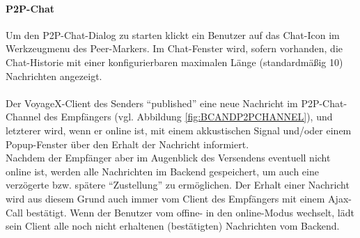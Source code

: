 \paragraph{P2P-Chat}
Um den P2P-Chat-Dialog zu starten klickt ein Benutzer auf das Chat-Icon im Werkzeugmenu des Peer-Markers. 
Im Chat-Fenster wird, sofern vorhanden, die Chat-Historie mit einer konfigurierbaren maximalen Länge (standardmäßig 10) Nachrichten angezeigt.\\ \\
Der VoyageX-Client des Senders "`published"' eine neue Nachricht im P2P-Chat-Channel des Empfängers (vgl. Abbildung \ref{fig:BCANDP2PCHANNEL}), und letzterer wird, wenn er online ist, mit einem akkustischen Signal und/oder einem Popup-Fenster über den Erhalt der Nachricht informiert.\\
Nachdem der Empfänger aber im Augenblick des Versendens eventuell nicht online ist, werden alle Nachrichten im Backend gespeichert, um auch eine verzögerte bzw. spätere "`Zustellung"' zu ermöglichen. Der Erhalt einer Nachricht wird aus diesem Grund auch immer vom Client des Empfängers mit einem Ajax-Call bestätigt. Wenn der Benutzer vom offine- in den online-Modus wechselt, lädt sein Client alle noch nicht erhaltenen (bestätigten) Nachrichten vom Backend.\\

